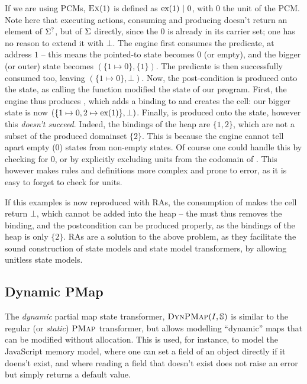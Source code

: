 If we are using PCMs, $\textsc{Ex}({1})$ is defined as $\text{ex}(1)~|~0$, with $0$ the unit of the PCM. Note here that executing actions, consuming and producing doesn't return an element of $\Sigma^?$, but of $\Sigma$ directly, since the $0$ is already in its carrier set; one has no reason to extend it with $\bot$. The engine first consumes the \exP{} predicate, at address $1$ -- this means the pointed-to state becomes $0$ (or empty), and the bigger (or outer) state becomes $(\{ 1\mapsto 0\}, \{ 1\})$. The \domainset{} predicate is then successfully consumed too, leaving $(\{ 1\mapsto 0\},\bot)$. Now, the post-condition is produced onto the state, as calling the function modified the state of our program. First, the engine thus produces , which adds a binding to \PMap{} and creates the cell: our bigger state is now $(\{ 1\mapsto 0, 2\mapsto \text{ex}(1)\},\bot)$. Finally,  is produced onto the state, however this \emph{doesn't succeed}. Indeed, the bindings of the heap are $\{1,2\}$, which are not a subset of the produced domainset $\{2\}$. This is because the engine cannot tell apart empty ($0$) states from non-empty states. Of course one could handle this by checking for $0$, or by explicitly excluding units from the codomain of \PMap{}. This however makes rules and definitions more complex and prone to error, as it is easy to forget to check for units.

If this examples is now reproduced with RAs, the consumption of  makes the cell return $\bot$, which cannot be added into the heap -- the \PMap{} must thus removes the binding, and the postcondition can be produced properly, as the bindings of the heap is only $\{2\}$. RAs are a solution to the above problem, as they facilitate the sound construction of state models and state model transformers, by allowing unitless state models.

\subsection{Dynamic PMap}

The \emph{dynamic} partial map state transformer, $\textsc{DynPMap}(I,\mathbb S)$ is similar to the regular (or \emph{static}) $\textsc{PMap}$ transformer, but allows modelling ``dynamic'' maps that can be modified without allocation. This is used, for instance, to model the JavaScript memory model, where one can set a field of an object directly if it doens't exist, and where reading a field that doesn't exist does not raise an error but simply returns a default  value.

